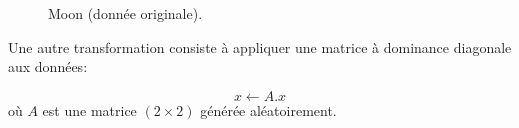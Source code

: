 \begin{figure}[htbp]
\centering
{}
\hfill
{}
\caption{Moon (donnée originale).}
\end{figure}

Une autre transformation consiste à appliquer une matrice à dominance
diagonale aux données:

\[ x \gets A.x \] où $A$ est une matrice $(2\times2)$ générée
aléatoirement.

